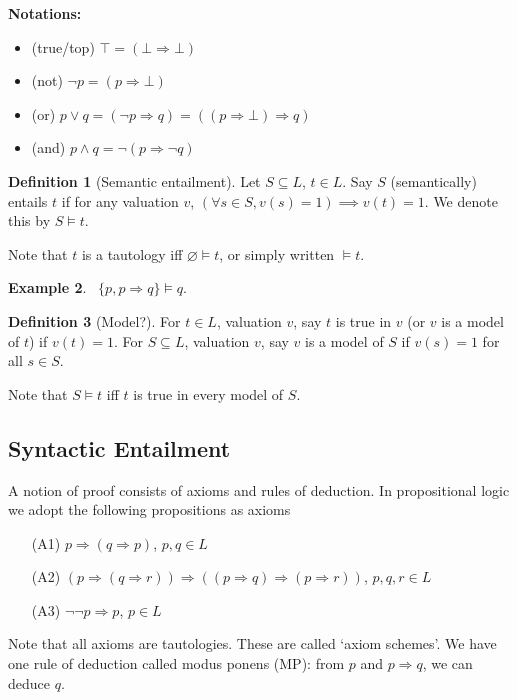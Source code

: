 \documentclass{article}
\theoremstyle{definition}
\newtheorem{defn}{Definition}[section]
\newtheorem{example}[defn]{Example}
\theoremstyle{remark}
\theoremstyle{plain}
\begin{document}
\textbf{Notations:}
\begin{itemize}
    \item (true/top) $\top=(\bot\Rightarrow\bot)$
    \item (not) $\neg p=(p\Rightarrow\bot)$
    \item (or) $p\vee q=(\neg p\Rightarrow q)=((p\Rightarrow\bot)\Rightarrow q)$
    \item (and) $p\wedge q=\neg (p\Rightarrow\neg q)$
\end{itemize}
\begin{defn}[Semantic entailment]
    Let $S\subseteq L$, $t\in L$. Say $S$ (semantically) entails $t$ if for any valuation $v$, $(\forall s\in S, v(s)=1)\implies v(t)=1$. We denote this by $S\models t$.
\end{defn}
Note that $t$ is a tautology iff $\varnothing\vDash t$, or simply written $\models t$.
\begin{example}\
    $\{p,p\Rightarrow q\}\models q$.
\end{example}
\begin{defn}[Model?]
    For $t\in L$, valuation $v$, say $t$ is true in $v$ (or $v$ is a model of $t$) if $v(t)=1$. For $S\subseteq L$, valuation $v$, say $v$ is a model of $S$ if $v(s)=1$ for all $s\in S$.
\end{defn}
Note that $S\models t$ iff $t$ is true in every model of $S$.

\subsection{Syntactic Entailment}
A notion of proof consists of axioms and rules of deduction. In propositional logic we adopt the following propositions as axioms
\begin{enumerate}
    \item[(A1)] $p\Rightarrow(q\Rightarrow p)$, $p,q\in L$
    \item[(A2)] $(p\Rightarrow(q\Rightarrow r))\Rightarrow((p\Rightarrow q)\Rightarrow(p\Rightarrow r))$, $p,q,r\in L$
    \item[(A3)] $\neg\neg p\Rightarrow p$, $p\in L$
\end{enumerate}
Note that all axioms are tautologies. These are called `axiom schemes'. We have one rule of deduction called modus ponens (MP): from $p$ and $p\Rightarrow q$, we can deduce $q$.
\end{document}
